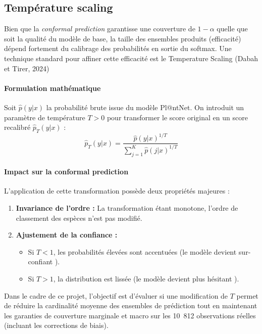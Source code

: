 \documentclass[12pt,a4paper]{article}
\begin{document}
\subsection{Température scaling}

Bien que la \textit{conformal prediction} garantisse une couverture de $1-\alpha$ quelle que soit la qualité du modèle de base, la taille des ensembles produits (efficacité) dépend fortement du calibrage des probabilités en sortie du softmax. Une technique standard pour affiner cette efficacité est le Temperature Scaling (Dabah et Tirer, 2024)


\paragraph{Formulation mathématique}
Soit $\hat{p}(y|x)$ la probabilité brute issue du modèle Pl@ntNet. On introduit un paramètre de température $T > 0$ pour transformer le score original en un score recalibré $\hat{p}_T(y|x)$ :
\begin{equation}
    \hat{p}_T(y|x) = \frac{\hat{p}(y|x)^{1/T}}{\sum_{j=1}^{K} \hat{p}(j|x)^{1/T}}
\end{equation}


\paragraph{Impact sur la conformal prediction}
L'application de cette transformation possède deux propriétés majeures :
\begin{enumerate}
    \item \textbf{Invariance de l'ordre :} La transformation étant monotone, l'ordre de classement des espèces n'est pas modifié. 
    \item \textbf{Ajustement de la confiance :} 
    \begin{itemize}
        \item Si $T < 1$, les probabilités élevées sont accentuées (le modèle devient \og sur-confiant \fg{}).
        \item Si $T > 1$, la distribution est lissée (le modèle devient \og plus hésitant \fg{}).
    \end{itemize}
\end{enumerate}

Dans le cadre de ce projet, l'objectif est d'évaluer si une modification de $T$ permet de réduire la cardinalité moyenne des ensembles de prédiction tout en maintenant les garanties de couverture marginale et macro sur les 10~812 observations réelles (incluant les corrections de biais).
\end{document}
